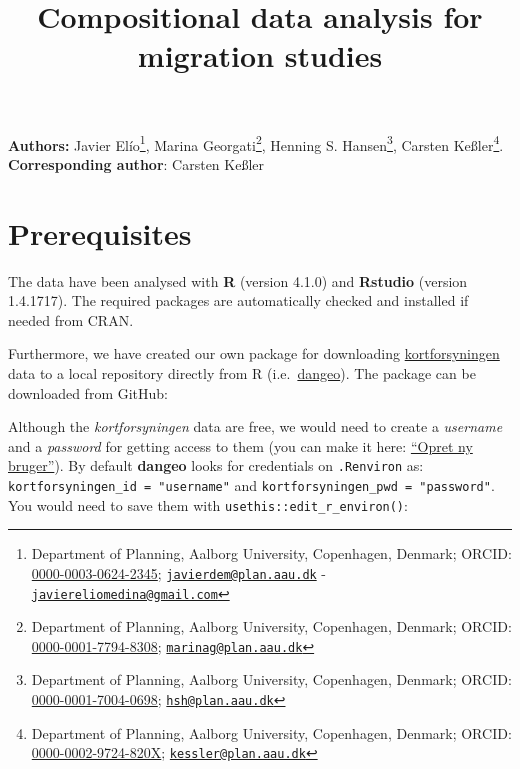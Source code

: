 \documentclass[
  12pt,
]{article}
\title{Compositional data analysis for migration studies}
\author{}
\date{\vspace{-2.5em}}
\begin{document}
\maketitle

\textbf{Authors:} Javier Elío\footnote{Department of Planning, Aalborg University, Copenhagen, Denmark; ORCID: \href{https://orcid.org/0000-0003-0624-2345}{0000-0003-0624-2345}; \href{mailto:javierdem@plan.aau.dk}{\nolinkurl{javierdem@plan.aau.dk}} - \href{mailto:javiereliomedina@gmail.com}{\nolinkurl{javiereliomedina@gmail.com}}},
Marina Georgati\footnote{Department of Planning, Aalborg University, Copenhagen, Denmark; ORCID: \href{https://orcid.org/0000-0001-7794-8308}{0000-0001-7794-8308}; \href{mailto:marinag@plan.aau.dk}{\nolinkurl{marinag@plan.aau.dk}}},
Henning S. Hansen\footnote{Department of Planning, Aalborg University, Copenhagen, Denmark; ORCID: \href{https://orcid.org/0000-0001-7004-0698}{0000-0001-7004-0698}; \href{mailto:hsh@plan.aau.dk}{\nolinkurl{hsh@plan.aau.dk}}},
Carsten Keßler\footnote{Department of Planning, Aalborg University, Copenhagen, Denmark; ORCID: \href{https://orcid.org/0000-0002-9724-820X}{0000-0002-9724-820X}; \href{mailto:kessler@plan.aau.dk}{\nolinkurl{kessler@plan.aau.dk}}}.\\

\textbf{Corresponding author}: Carsten Keßler\\

\hypertarget{prerequisites}{%
\section{Prerequisites}\label{prerequisites}}

The data have been analysed with \textbf{R} (version 4.1.0) and \textbf{Rstudio} (version 1.4.1717). The required packages are automatically checked and installed if needed from CRAN.

Furthermore, we have created our own package for downloading \href{https://kortforsyningen.dk/}{kortforsyningen} data to a local repository directly from R (i.e.~\href{https://github.com/javiereliomedina/dangeo.git}{dangeo}). The package can be downloaded from GitHub:

Although the \emph{kortforsyningen} data are free, we would need to create a \emph{username} and a \emph{password} for getting access to them (you can make it here: \href{https://kortforsyningen.dk/indhold/min-side-0}{``Opret ny bruger''}). By default \textbf{dangeo} looks for credentials on \texttt{.Renviron} as: \texttt{kortforsyningen\_id\ =\ "username"} and \texttt{kortforsyningen\_pwd\ =\ "password"}. You would need to save them with \texttt{usethis::edit\_r\_environ()}:
\end{document}
